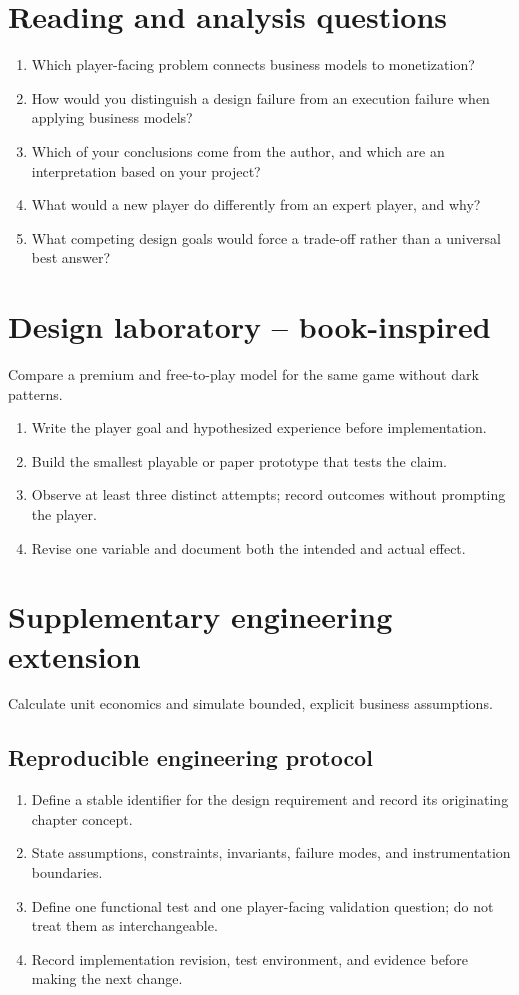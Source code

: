 \documentclass[11pt]{article}
\begin{document}
\section{Reading and analysis questions}
\begin{enumerate}
\item Which player-facing problem connects business models to monetization?
\item How would you distinguish a design failure from an execution failure when applying business models?
\item Which of your conclusions come from the author, and which are an interpretation based on your project?
\item What would a new player do differently from an expert player, and why?
\item What competing design goals would force a trade-off rather than a universal best answer?
\end{enumerate}

\section{Design laboratory -- book-inspired}
Compare a premium and free-to-play model for the same game without dark patterns.

\begin{enumerate}
\item Write the player goal and hypothesized experience before implementation.
\item Build the smallest playable or paper prototype that tests the claim.
\item Observe at least three distinct attempts; record outcomes without prompting the player.
\item Revise one variable and document both the intended and actual effect.
\end{enumerate}

\section{Supplementary engineering extension}
Calculate unit economics and simulate bounded, explicit business assumptions.


\subsection{Reproducible engineering protocol}
\begin{enumerate}
\item Define a stable identifier for the design requirement and record its originating chapter concept.
\item State assumptions, constraints, invariants, failure modes, and instrumentation boundaries.
\item Define one functional test and one player-facing validation question; do not treat them as interchangeable.
\item Record implementation revision, test environment, and evidence before making the next change.
\end{enumerate}
\end{document}
